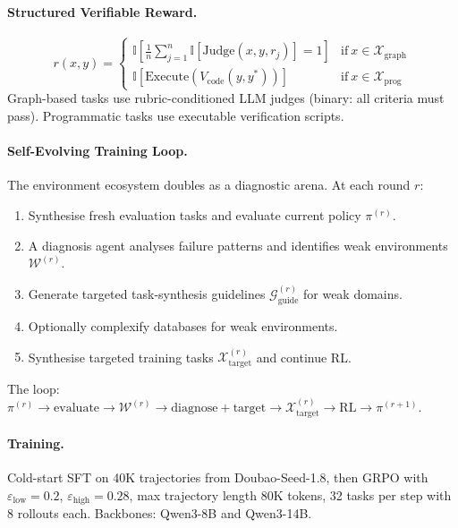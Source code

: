 \documentclass[11pt]{article}
\begin{document}
\paragraph{Structured Verifiable Reward.}
\begin{equation}
    r(x, y) = \begin{cases}
        \mathbb{I}\!\left[\frac{1}{n}\sum_{j=1}^{n} \mathbb{I}[\mathrm{Judge}(x, y, r_j)] = 1\right] & \mathrm{if}\ x \in \mathcal{X}_{\mathrm{graph}} \\[4pt]
        \mathbb{I}[\mathrm{Execute}(V_{\mathrm{code}}(y, y^*))] & \mathrm{if}\ x \in \mathcal{X}_{\mathrm{prog}}
    \end{cases}
\end{equation}
Graph-based tasks use rubric-conditioned LLM judges (binary: all criteria must pass). Programmatic tasks use executable verification scripts.

\paragraph{Self-Evolving Training Loop.}
The environment ecosystem doubles as a diagnostic arena. At each round $r$:
\begin{enumerate}
    \item Synthesise fresh evaluation tasks and evaluate current policy $\pi^{(r)}$.
    \item A diagnosis agent analyses failure patterns and identifies weak environments $\mathcal{W}^{(r)}$.
    \item Generate targeted task-synthesis guidelines $\mathcal{G}_{\mathrm{guide}}^{(r)}$ for weak domains.
    \item Optionally complexify databases for weak environments.
    \item Synthesise targeted training tasks $\mathcal{X}_{\mathrm{target}}^{(r)}$ and continue RL.
\end{enumerate}
The loop: $\pi^{(r)} \to \mathrm{evaluate} \to \mathcal{W}^{(r)} \to \mathrm{diagnose{+}target} \to \mathcal{X}_{\mathrm{target}}^{(r)} \to \mathrm{RL} \to \pi^{(r+1)}$.

\paragraph{Training.}
Cold-start SFT on 40K trajectories from Doubao-Seed-1.8, then GRPO with $\varepsilon_{\mathrm{low}} = 0.2$, $\varepsilon_{\mathrm{high}} = 0.28$, max trajectory length 80K tokens, 32 tasks per step with 8 rollouts each. Backbones: Qwen3-8B and Qwen3-14B.
\end{document}
